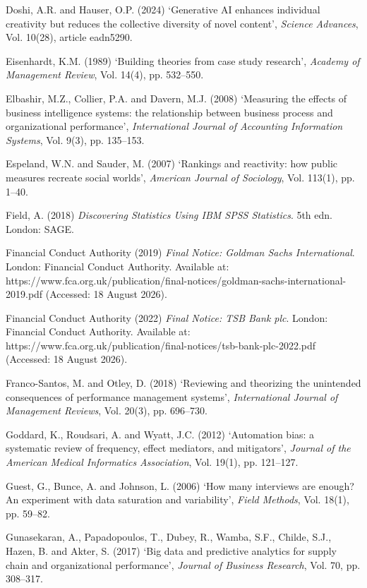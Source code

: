 \documentclass[12pt,a4paper]{article}
\begin{document}
{\rf Doshi, A.R. and Hauser, O.P. (2024) `Generative AI enhances individual creativity but reduces the collective diversity of novel content', \emph{Science Advances}, Vol. 10(28), article eadn5290.

\rf Eisenhardt, K.M. (1989) `Building theories from case study research', \emph{Academy of Management Review}, Vol. 14(4), pp. 532--550.

\rf Elbashir, M.Z., Collier, P.A. and Davern, M.J. (2008) `Measuring the effects of business intelligence systems: the relationship between business process and organizational performance', \emph{International Journal of Accounting Information Systems}, Vol. 9(3), pp. 135--153.

\rf Espeland, W.N. and Sauder, M. (2007) `Rankings and reactivity: how public measures recreate social worlds', \emph{American Journal of Sociology}, Vol. 113(1), pp. 1--40.

\rf Field, A. (2018) \emph{Discovering Statistics Using IBM SPSS Statistics}. 5th edn. London: SAGE.

\rf Financial Conduct Authority (2019) \emph{Final Notice: Goldman Sachs International}. London: Financial Conduct Authority. Available at: https://www.fca.org.uk/publication/final-notices/goldman-sachs-international-2019.pdf (Accessed: 18 August 2026).

\rf Financial Conduct Authority (2022) \emph{Final Notice: TSB Bank plc}. London: Financial Conduct Authority. Available at: https://www.fca.org.uk/publication/final-notices/tsb-bank-plc-2022.pdf (Accessed: 18 August 2026).

\rf Franco-Santos, M. and Otley, D. (2018) `Reviewing and theorizing the unintended consequences of performance management systems', \emph{International Journal of Management Reviews}, Vol. 20(3), pp. 696--730.

\rf Goddard, K., Roudsari, A. and Wyatt, J.C. (2012) `Automation bias: a systematic review of frequency, effect mediators, and mitigators', \emph{Journal of the American Medical Informatics Association}, Vol. 19(1), pp. 121--127.

\rf Guest, G., Bunce, A. and Johnson, L. (2006) `How many interviews are enough? An experiment with data saturation and variability', \emph{Field Methods}, Vol. 18(1), pp. 59--82.

\rf Gunasekaran, A., Papadopoulos, T., Dubey, R., Wamba, S.F., Childe, S.J., Hazen, B. and Akter, S. (2017) `Big data and predictive analytics for supply chain and organizational performance', \emph{Journal of Business Research}, Vol. 70, pp. 308--317.

}
\end{document}
